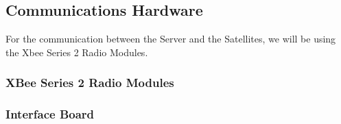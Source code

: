 
\subsection{Communications Hardware}


For the communication between the Server and the Satellites,
we will be using the Xbee Series 2 Radio Modules.

\subsubsection{XBee Series 2 Radio Modules}


\subsubsection{Interface Board}

